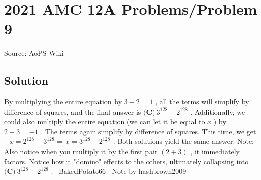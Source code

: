 \documentclass[12pt]{article}
\begin{document}
\section*{{2021 AMC 12A Problems/Problem 9}}
Source: AoPS Wiki

\subsection*{Solution}
By multiplying the entire equation by $3-2=1$ , all the terms will simplify by difference of squares, and the final answer is $\boxed{\textbf{(C)} ~3^{128}-2^{128}}$ . Additionally, we could also multiply the entire equation (we can let it be equal to $x$ ) by $2-3=-1$ . The terms again simplify by difference of squares. This time, we get $-x=2^{128}-3^{128} \Rightarrow x=3^{128}-2^{128}$ . Both solutions yield the same answer. Note: Also notice when you multiply it by the first pair $(2+3)$ , it immediately factors. Notice how it "domino" effects to the others, ultimately collapsing into $\boxed{\textbf{(C)} ~3^{128}-2^{128}}$ . ~BakedPotato66
~Note by hashbrown2009
\end{document}
